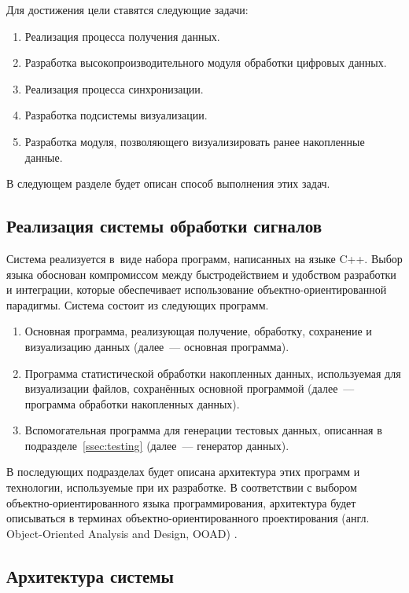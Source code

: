 \documentclass[a4paper, 14pt, titlepage]{extarticle}
\newcommand{\eng}[1]{\foreignlanguage{english}{#1}}
\begin{document}
  Для достижения цели ставятся следующие задачи:
  \begin{enumerate}
    \item Реализация процесса получения данных.
    \item Разработка высокопроизводительного модуля обработки цифровых данных.
    \item Реализация процесса синхронизации.
    \item Разработка подсистемы визуализации.
    \item Разработка модуля, позволяющего визуализировать ранее накопленные данные.
  \end{enumerate}

  В следующем разделе будет описан способ выполнения этих задач.

  \subsection{Реализация системы обработки сигналов}\label{ssec:impl}

  Система реализуется в~виде набора программ, написанных на языке C++. Выбор языка обоснован
  компромиссом между быстродействием и удобством разработки и интеграции, которые обеспечивает
  использование объектно-ориентированной парадигмы. Система состоит из следующих программ.

  \begin{enumerate}
    \item Основная программа, реализующая получение, обработку, сохранение и визуализацию данных
      (далее~--- основная программа).
    \item Программа статистической обработки накопленных данных, используемая для визуализации
      файлов, сохранённых основной программой (далее~--- программа обработки накопленных данных).
    \item Вспомогательная программа для генерации тестовых данных, описанная в подразделе~\ref{ssec:testing}
      (далее~--- генератор данных).
  \end{enumerate}

  В последующих подразделах будет описана архитектура этих программ и технологии, используемые при их
  разработке. В соответствии с выбором объектно-ориентированного языка программирования, архитектура будет описываться в
  терминах объектно-ориентированного проектирования (англ. \eng{Object-Oriented Analysis and Design,
  OOAD}) \cite{booch-ooad}.

  \subsection{Архитектура системы}
\end{document}
